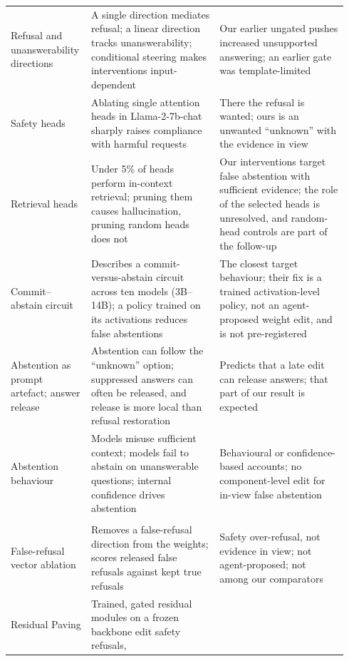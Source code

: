 \begin{longtable}{@{}L{0.2\linewidth}L{0.37\linewidth}L{0.37\linewidth}@{}}
Refusal and unanswerability directions \citep{arditi2024refusal,lavi2025unanswerability,lee2025cast} & A single
direction mediates refusal; a linear direction tracks unanswerability; conditional steering makes interventions
input-dependent & Our earlier ungated pushes increased unsupported answering; an earlier gate was template-limited \\
Safety heads \citep{zhou2025safetyheads} & Ablating single attention heads in Llama-2-7b-chat sharply raises
compliance with harmful requests & There the refusal is wanted; ours is an unwanted ``unknown'' with the evidence in
view \\
Retrieval heads \citep{wu2025retrievalheads} & Under 5\% of heads perform in-context retrieval; pruning them causes
hallucination, pruning random heads does not & Our interventions target false abstention with sufficient evidence;
the role of the selected heads is unresolved, and random-head controls are part of the follow-up \\
Commit--abstain circuit \citep{commitabstain2026} & Describes a commit-versus-abstain circuit across ten models
(3B--14B); a policy trained on its activations reduces false abstentions & The closest target behaviour; their fix is
a trained activation-level policy, not an agent-proposed weight edit, and is not pre-registered \\
Abstention as prompt artefact; answer release \citep{ling2025artifact,liu2026broken} & Abstention can follow the
``unknown'' option; suppressed answers can often be released, and release is more local than refusal restoration &
Predicts that a late edit can release answers; that part of our result is expected \\
Abstention behaviour \citep{joren2025sufficient,kirichenko2025abstentionbench,kumaran2026confidence} & Models
misuse sufficient context; models fail to abstain on unanswerable questions; internal confidence drives abstention &
Behavioural or confidence-based accounts; no component-level edit for in-view false abstention \\
\addlinespace
{} \\*
False-refusal vector ablation \citep{wang2025falserefusal} & Removes a false-refusal direction from the weights;
scores released false refusals against kept true refusals & Safety over-refusal, not evidence in view; not
agent-proposed; not among our comparators \\
Residual Paving \citep{hinkley2026paving} & Trained, gated residual modules on a frozen backbone edit safety refusals,

\end{longtable}
